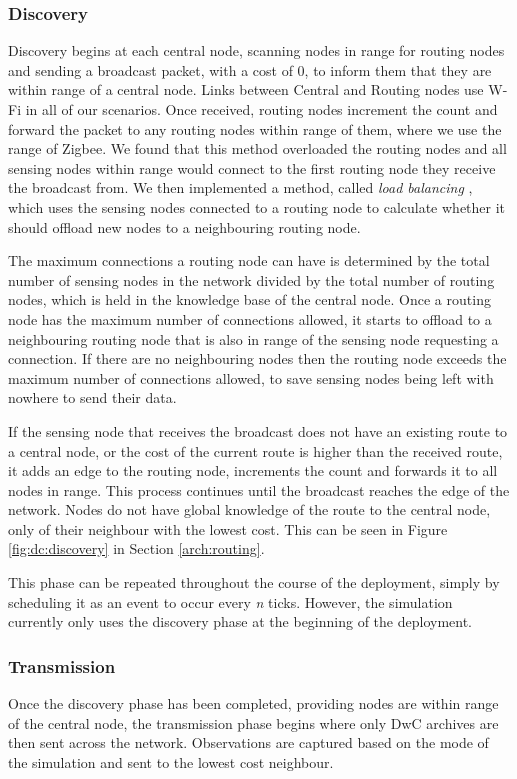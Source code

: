 \subsubsection{Discovery}\label{sim:disc}
	Discovery begins at each central node, scanning nodes in range for routing nodes and sending a broadcast packet, with a cost of 0, to inform them that they are within range of a central node. Links between Central and Routing nodes use W-Fi in all of our scenarios. Once received, routing nodes increment the count and forward the packet to any routing nodes within range of them, where we use the range of Zigbee. We found that this method overloaded the routing nodes and all sensing nodes within range would connect to the first routing node they receive the broadcast from. We then implemented a method, called \textit{load balancing} \cite{Gupta2003}, which uses the sensing nodes connected to a routing node to calculate whether it should offload new nodes to a neighbouring routing node.
	
	The maximum connections a routing node can have is determined by the total number of sensing nodes in the network divided by the total number of routing nodes, which is held in the knowledge base of the central node. Once a routing node has the maximum number of connections allowed, it starts to offload to a neighbouring routing node that is also in range of the sensing node requesting a connection. If there are no neighbouring nodes then the routing node exceeds the maximum number of connections allowed, to save sensing nodes being left with nowhere to send their data.
	
	If the sensing node that receives the broadcast does not have an existing route to a central node, or the cost of the current route is higher than the received route, it adds an edge to the routing node, increments the count and forwards it to all nodes in range. This process continues until the broadcast reaches the edge of the network. Nodes do not have global knowledge of the route to the central node, only of their neighbour with the lowest cost. This can be seen in Figure \ref{fig:dc:discovery} in Section \ref{arch:routing}.
	
	This phase can be repeated throughout the course of the deployment, simply by scheduling it as an event to occur every \textit{n} ticks. However, the simulation currently only uses the discovery phase at the beginning of the deployment.
	
\subsubsection{Transmission}
	Once the discovery phase has been completed, providing nodes are within range of the central node, the transmission phase begins where only DwC archives are then sent across the network. Observations are captured based on the mode of the simulation and sent to the lowest cost neighbour.
	
